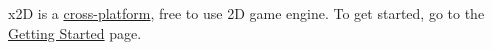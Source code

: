 x2\+D is a \hyperlink{platforms}{cross-\/platform}, free to use 2\+D game engine. To get started, go to the \hyperlink{get_started}{Getting Started} page. 